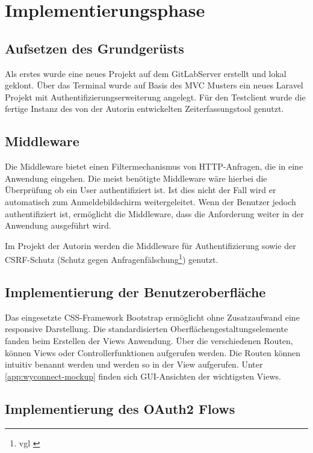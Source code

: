 \section{Implementierungsphase} 
\label{sec:Implementierungsphase}

\subsection{Aufsetzen des Grundgerüsts}
\label{sec:AufsetzenGrundgeruest}

Als erstes wurde eine neues Projekt auf dem GitLabServer erstellt und lokal geklont. Über das Terminal wurde auf Basis des MVC Musters ein neues Laravel Projekt mit Authentifizierungserweiterung angelegt. 
Für den Testclient wurde die fertige Instanz des von der Autorin entwickelten Zeiterfassungstool genutzt.

\subsection{Middleware}
\label{sec:Middleware}
Die Middleware bietet einen Filtermechanismus von HTTP-Anfragen, die in eine Anwendung eingehen. Die meist benötigte Middleware wäre hierbei die Überprüfung ob ein User authentifiziert ist. Ist dies nicht der Fall wird er automatisch zum Anmeldebildschirm weitergeleitet. Wenn der Benutzer jedoch authentifiziert ist, ermöglicht die Middleware, dass die Anforderung weiter in der Anwendung ausgeführt wird.

Im Projekt der Autorin werden die Middleware für Authentifizierung sowie der \acs{CSRF}-Schutz (Schutz gegen Anfragenfälschung\footnote{vgl \cite{CSRF}}) genutzt.

\subsection{Implementierung der Benutzeroberfläche}
\label{sec:ImplBenutzeroberflaeche}

Das eingesetzte CSS-Framework Bootstrap ermöglicht ohne Zusatzaufwand eine responsive Darstellung. Die standardisierten Oberflächengestaltungselemente fanden beim Erstellen der Views Anwendung. 
Über die verschiedenen Routen, können Views oder Controllerfunktionen aufgerufen werden. Die Routen können intuitiv benannt werden und werden so in der View aufgerufen.
Unter \ref{app:wyconnect-mockup} finden sich GUI-Ansichten der wichtigsten Views.

\subsection{Implementierung des OAuth2 Flows}
\label{sec:ImplementierungOAuth2}


